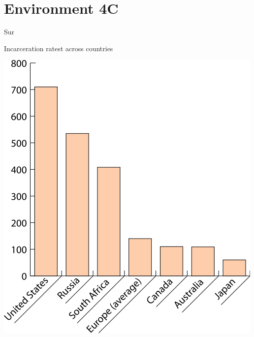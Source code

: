 \section{Environment 4C}

\begin{map}{S}{ur}
\caption{Incarceration ratest across countries}
\label{chart:incarceration}
\includegraphics[width=\chartwidth,height=\chartheight]{incarceration}  
\end{map}

